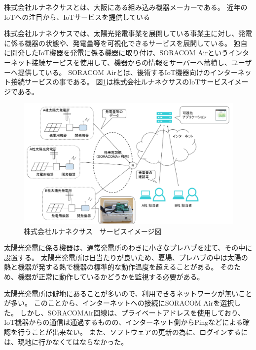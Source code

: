 株式会社ルナネクサスとは、大阪にある組み込み機器メーカーである。
近年のIoTへの注目から、IoTサービスを提供している

株式会社ルナネクサスでは、太陽光発電事業を展開している事業主に対し、発電に係る機器の状態や、発電量等を可視化できるサービスを展開している。
独自に開発したIoT機器を発電に係る機器に取り付け、SORACOM Airというインターネット接続サービスを使用して、機器からの情報をサーバーへ蓄積し、ユーザーへ提供している。
SORACOM Airとは、後術するIoT機器向けのインターネット接続サービスの事である。
図\ref{fig:lunafig}は株式会社ルナネクサスのIoTサービスイメージである。
\begin{figure}[htbp]
\includegraphics[width=16cm]{images/lunafig.png}
\caption{株式会社ルナネクサス　サービスイメージ図}
\label{fig:lunafig}
\end{figure}



太陽光発電に係る機器は、通常発電所のわきに小さなプレハブを建て、その中に設置する。
太陽光発電所は日当たりが良いため、夏場、プレハブの中は太陽の熱と機器が発する熱で機器の標準的な動作温度を超えることがある。
そのため、機器が正常に動作しているかどうかを監視する必要がある。

太陽光発電所は僻地にあることが多いので、利用できるネットワークが無いことが多い。
このことから、インターネットへの接続にSORACOM Airを選択した。
しかし、SORACOMAir回線は、プライベートアドレスを使用しており、IoT機器からの通信は通過するものの、インターネット側からPingなどによる確認を行うことが出来ない。
また、ソフトウェアの更新の為に、ログインするには、現地に行かなくてはならなかった。

